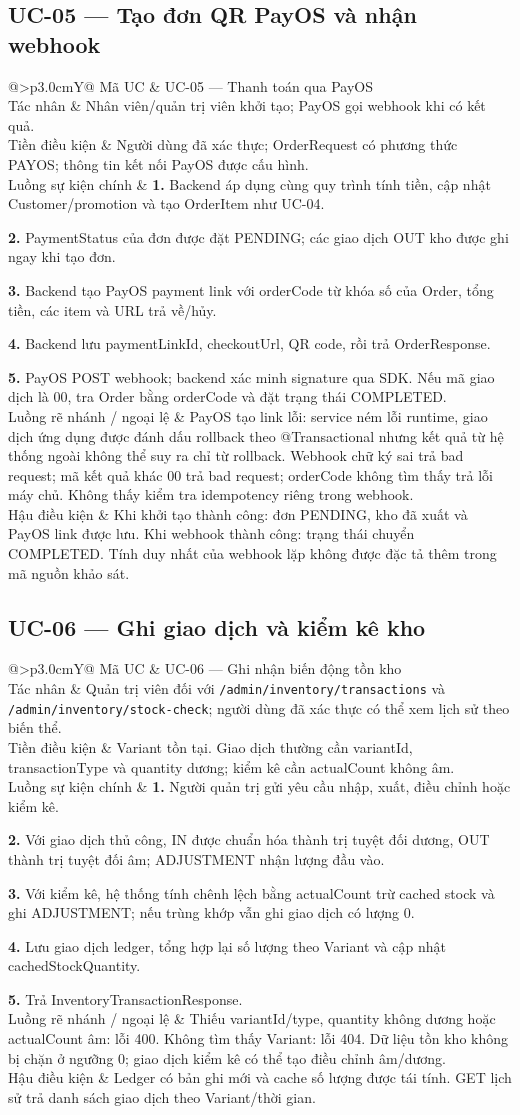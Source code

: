 \documentclass[12pt,a4paper,oneside]{report}
\makeatletter
\newcommand{\UC}[6]{%
\par\medskip\noindent\begin{tabularx}{\textwidth}{@{}>{\bfseries\color{navy}}p{3.0cm}Y@{}}\toprule
Mã UC & #1\\
Tác nhân & #2\\
Tiền điều kiện & #3\\
Luồng sự kiện chính & #4\\
Luồng rẽ nhánh / ngoại lệ & #5\\
Hậu điều kiện & #6\\
\bottomrule\end{tabularx}\par\smallskip
}
\makeatother
\begin{document}
\subsection{UC-05 — Tạo đơn QR PayOS và nhận webhook}
\UC{UC-05 — Thanh toán qua PayOS}{Nhân viên/quản trị viên khởi tạo; PayOS gọi webhook khi có kết quả.}{Người dùng đã xác thực; OrderRequest có phương thức PAYOS; thông tin kết nối PayOS được cấu hình.}{\textbf{1.} Backend áp dụng cùng quy trình tính tiền, cập nhật Customer/promotion và tạo OrderItem như UC-04.\par\textbf{2.} PaymentStatus của đơn được đặt PENDING; các giao dịch OUT kho được ghi ngay khi tạo đơn.\par\textbf{3.} Backend tạo PayOS payment link với orderCode từ khóa số của Order, tổng tiền, các item và URL trả về/hủy.\par\textbf{4.} Backend lưu paymentLinkId, checkoutUrl, QR code, rồi trả OrderResponse.\par\textbf{5.} PayOS POST webhook; backend xác minh signature qua SDK. Nếu mã giao dịch là 00, tra Order bằng orderCode và đặt trạng thái COMPLETED.}{PayOS tạo link lỗi: service ném lỗi runtime, giao dịch ứng dụng được đánh dấu rollback theo @Transactional nhưng kết quả từ hệ thống ngoài không thể suy ra chỉ từ rollback. Webhook chữ ký sai trả bad request; mã kết quả khác 00 trả bad request; orderCode không tìm thấy trả lỗi máy chủ. Không thấy kiểm tra idempotency riêng trong webhook.}{Khi khởi tạo thành công: đơn PENDING, kho đã xuất và PayOS link được lưu. Khi webhook thành công: trạng thái chuyển COMPLETED. Tính duy nhất của webhook lặp không được đặc tả thêm trong mã nguồn khảo sát.}

\subsection{UC-06 — Ghi giao dịch và kiểm kê kho}
\UC{UC-06 — Ghi nhận biến động tồn kho}{Quản trị viên đối với \texttt{/admin/inventory/transactions} và \texttt{/admin/inventory/stock-check}; người dùng đã xác thực có thể xem lịch sử theo biến thể.}{Variant tồn tại. Giao dịch thường cần variantId, transactionType và quantity dương; kiểm kê cần actualCount không âm.}{\textbf{1.} Người quản trị gửi yêu cầu nhập, xuất, điều chỉnh hoặc kiểm kê.\par\textbf{2.} Với giao dịch thủ công, IN được chuẩn hóa thành trị tuyệt đối dương, OUT thành trị tuyệt đối âm; ADJUSTMENT nhận lượng đầu vào.\par\textbf{3.} Với kiểm kê, hệ thống tính chênh lệch bằng actualCount trừ cached stock và ghi ADJUSTMENT; nếu trùng khớp vẫn ghi giao dịch có lượng 0.\par\textbf{4.} Lưu giao dịch ledger, tổng hợp lại số lượng theo Variant và cập nhật cachedStockQuantity.\par\textbf{5.} Trả InventoryTransactionResponse.}{Thiếu variantId/type, quantity không dương hoặc actualCount âm: lỗi 400. Không tìm thấy Variant: lỗi 404. Dữ liệu tồn kho không bị chặn ở ngưỡng 0; giao dịch kiểm kê có thể tạo điều chỉnh âm/dương.}{Ledger có bản ghi mới và cache số lượng được tái tính. GET lịch sử trả danh sách giao dịch theo Variant/thời gian.}
\end{document}

